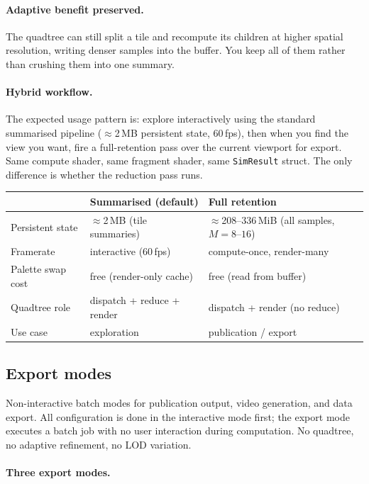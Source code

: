 \documentclass[11pt]{report}
\begin{document}
\paragraph{Adaptive benefit preserved.} The quadtree can still split a tile and recompute its children at higher spatial resolution, writing denser samples into the buffer. You keep all of them rather than crushing them into one summary.

\paragraph{Hybrid workflow.} The expected usage pattern is: explore interactively using the standard summarised pipeline ($\approx$2\,MB persistent state, 60\,fps), then when you find the view you want, fire a full-retention pass over the current viewport for export. Same compute shader, same fragment shader, same \texttt{SimResult} struct. The only difference is whether the reduction pass runs.

\begin{center}
\begin{tabular}{lll}
\toprule
& Summarised (default) & Full retention \\
\midrule
Persistent state & $\approx$2\,MB (tile summaries) & $\approx$208--336\,MiB (all samples, $M=8$--$16$) \\
Framerate & interactive (60\,fps) & compute-once, render-many \\
Palette swap cost & free (render-only cache) & free (read from buffer) \\
Quadtree role & dispatch + reduce + render & dispatch + render (no reduce) \\
Use case & exploration & publication / export \\
\bottomrule
\end{tabular}
\end{center}

\subsection{Export modes}
\label{sec:flat_render}

Non-interactive batch modes for publication output, video generation, and data export. All configuration is done in the interactive mode first; the export mode executes a batch job with no user interaction during computation. No quadtree, no adaptive refinement, no LOD variation.

\paragraph{Three export modes.}
\end{document}

